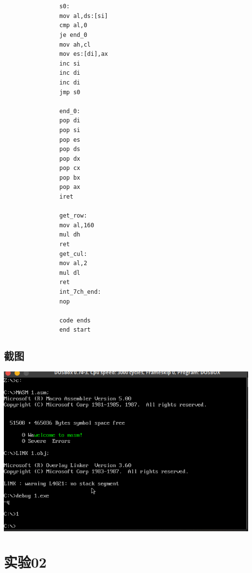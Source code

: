 \documentclass[UTF8,AutoFakeBold,AutoFakeSlant,zihao=-4]{ctexart}
\begin{document}
\begin{verbatim}
				
				
				s0:
				mov al,ds:[si]
				cmp al,0
				je end_0
				mov ah,cl
				mov es:[di],ax
				inc si
				inc di
				inc di
				jmp s0
				
				end_0:
				pop di
				pop si
				pop es
				pop ds
				pop dx
				pop cx
				pop bx
				pop ax
				iret
				
				get_row:
				mov al,160
				mul dh
				ret
				get_cul:
				mov al,2
				mul dl
				ret
				int_7ch_end:
				nop
				
				code ends
				end start
			\end{verbatim}
			
		\subsection{截图}
		
				\includegraphics{chapter13.assets/001}
				
	\section{实验02}
\end{document}
